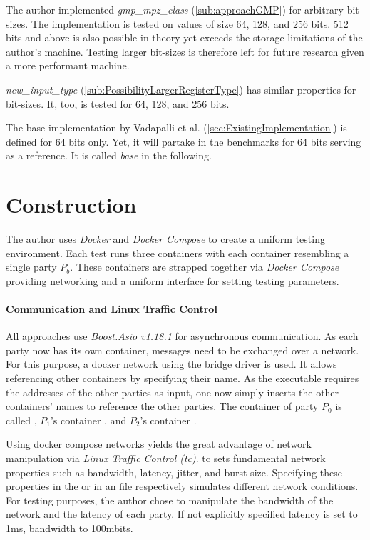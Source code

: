 \label{sec:experimentalEvaluation}
The author implemented \textit{gmp\_mpz\_class} (\ref{sub:approachGMP}) for arbitrary bit sizes.
The implementation is tested on values of size 64, 128, and 256 bits.
512 bits and above is also possible in theory yet exceeds the storage limitations of the author's machine.
Testing larger bit-sizes is therefore left for future research given a more performant machine.

\textit{new\_input\_type} (\ref{sub:PossibilityLargerRegisterType}) has similar properties for bit-sizes.
It, too, is tested for 64, 128, and 256 bits.

The base implementation by Vadapalli et al. (\ref{sec:ExistingImplementation}) is defined for 64 bits only.
Yet, it will partake in the benchmarks for 64 bits serving as a reference.
It is called \textit{base} in the following.

\section{Construction}\label{sub:expEvaConstruction}
The author uses \textit{Docker} and \textit{Docker Compose} to create a uniform testing environment.
Each test runs three containers with each container resembling a single party $P_b$.
These containers are strapped together via \textit{Docker Compose} providing networking and a uniform interface for setting testing parameters.

\paragraph{Communication and Linux Traffic Control}\label{sub:dockerCommunication}
All approaches use \textit{Boost.Asio v1.18.1} for asynchronous communication.
As each party now has its own container, messages need to be exchanged over a network.
For this purpose, a docker network using the bridge driver is used.
It allows referencing other containers by specifying their name.
As the executable requires the addresses of the other parties as input, one now simply inserts the other containers' names to reference the other parties.
The container of party $P_0$ is called , $P_1$'s container , and $P_2$'s container .

Using docker compose networks yields the great advantage of network manipulation via \textit{Linux Traffic Control (tc)}.
tc sets fundamental network properties such as bandwidth, latency, jitter, and burst-size.
Specifying these properties in the  or in an  file respectively simulates different network conditions.
For testing purposes, the author chose to manipulate the bandwidth of the network and the latency of each party.
If not explicitly specified latency is set to 1ms, bandwidth to 100mbits.


